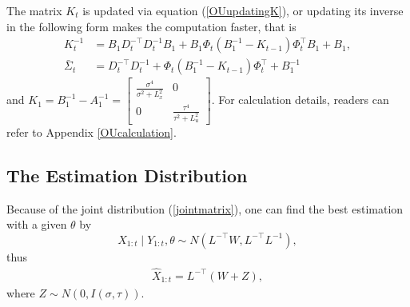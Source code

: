 The matrix $K_{t}$ is updated via equation (\ref{OUupdatingK}), or updating its inverse in the following form makes the computation faster, that is 
\begin{align*}
K_{t}^{-1} &= B_1D_{t}^{-\top}D_{t}^{-1}B_1 + B_1\Phi_{t} \left(B_1^{-1} - K_{t-1}\right) \Phi_{t}^\top B_1+ B_1,\\
\bar{\Sigma}_{t} &= D_{t}^{-\top}D_{t}^{-1}+ \Phi_{t} \left(B_1^{-1} - K_{t-1}\right) \Phi_{t}^\top + B_1^{-1}
\end{align*}
and $K_1 =B_1^{-1} - A_1^{-1} = \begin{bmatrix}
\frac{\sigma^4}{\sigma^2 +L_x^2} & 0 \\ 0 &\frac{\tau^4}{\tau^2 +L_u^2}
\end{bmatrix} $. For calculation details, readers can refer to Appendix \ref{OUcalculation}. 


\subsection{The Estimation Distribution}

Because of the joint distribution (\ref{jointmatrix}), one can find the best estimation with a given $\theta$ by
\begin{equation*}
X_{1:t} \mid Y_{1:t},\theta \sim N\left(L^{-\top}W,L^{-\top}L^{-1}\right),
\end{equation*}
thus
\begin{align*}
\hat{X} _{1:t}= L^{-\top}\left(W+Z\right),
\end{align*}
where $Z \sim N\left(0, I(\sigma,\tau)\right)$.

